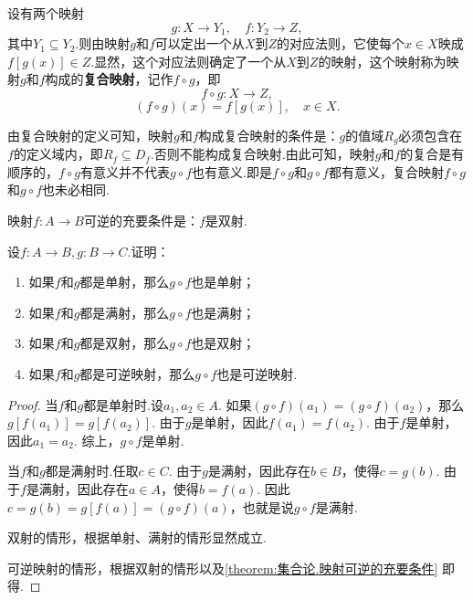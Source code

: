 \begin{definition}
设有两个映射\[
g\colon X \to Y_1, \quad f\colon Y_2 \to Z,
\]其中\(Y_1 \subseteq Y_2\).则由映射\(g\)和\(f\)可以定出一个从\(X\)到\(Z\)的对应法则，它使每个\(x \in X\)映成\(f[g(x)] \in Z\).显然，这个对应法则确定了一个从\(X\)到\(Z\)的映射，这个映射称为映射\(g\)和\(f\)构成的\textbf{复合映射}，记作\(f \circ g\)，即\[
f \circ g: X \to Z,
\]\[
(f \circ g)(x) = f[g(x)], \quad x \in X.
\]

由复合映射的定义可知，映射\(g\)和\(f\)构成复合映射的条件是：\(g\)的值域\(R_g\)必须包含在\(f\)的定义域内，即\(R_f \subseteq D_f\).否则不能构成复合映射.由此可知，映射\(g\)和\(f\)的复合是有顺序的，\(f \circ g\)有意义并不代表\(g \circ f\)也有意义.即是\(f \circ g\)和\(g \circ f\)都有意义，复合映射\(f \circ g\)和\(g \circ f\)也未必相同.
\end{definition}

\begin{theorem}\label{theorem:集合论.映射可逆的充要条件}
映射\(f\colon A \to B\)可逆的充要条件是：\(f\)是双射.
\end{theorem}

\begin{example}
设\(f\colon A \to B, g\colon B \to C\).证明：\begin{enumerate}
\item 如果\(f\)和\(g\)都是单射，那么\(g \circ f\)也是单射；
\item 如果\(f\)和\(g\)都是满射，那么\(g \circ f\)也是满射；
\item 如果\(f\)和\(g\)都是双射，那么\(g \circ f\)也是双射；
\item 如果\(f\)和\(g\)都是可逆映射，那么\(g \circ f\)也是可逆映射.
\end{enumerate}
\begin{proof}
当\(f\)和\(g\)都是单射时.设\(a_1,a_2 \in A\).
如果\((g \circ f)(a_1) = (g \circ f)(a_2)\)，那么\(g[f(a_1)] = g[f(a_2)]\).
由于\(g\)是单射，因此\(f(a_1) = f(a_2)\).
由于\(f\)是单射，因此\(a_1 = a_2\).
综上，\(g \circ f\)是单射.

当\(f\)和\(g\)都是满射时.任取\(c \in C\).
由于\(g\)是满射，因此存在\(b \in B\)，使得\(c = g(b)\).
由于\(f\)是满射，因此存在\(a \in A\)，使得\(b = f(a)\).
因此\(c = g(b) = g[f(a)] = (g \circ f)(a)\)，也就是说\(g \circ f\)是满射.

双射的情形，根据单射、满射的情形显然成立.

可逆映射的情形，根据双射的情形以及\cref{theorem:集合论.映射可逆的充要条件} 即得.
\end{proof}
\end{example}


